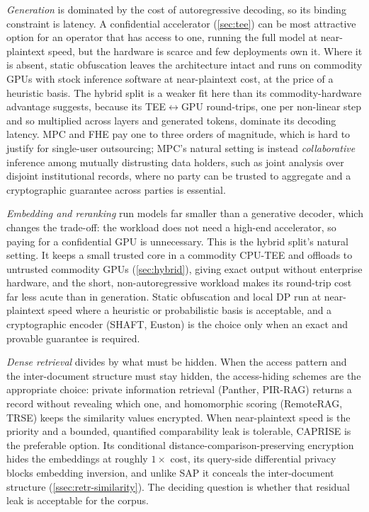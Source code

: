 \emph{Generation} is dominated by the cost of autoregressive decoding, so its binding
constraint is latency. A confidential accelerator (\cref{sec:tee}) can be most attractive option for
an operator that has access to one, running the full model at near-plaintext speed, but the hardware is
scarce and few deployments own it. Where it is absent, static obfuscation leaves the
architecture intact and runs on commodity GPUs with stock inference software at near-plaintext
cost, at the price of a heuristic basis. The hybrid
split is a weaker fit here than its commodity-hardware advantage suggests, because its
TEE$\leftrightarrow$GPU round-trips, one per non-linear step and so multiplied across layers and
generated tokens, dominate its decoding latency.
MPC and FHE pay one to three orders of magnitude, which is hard to justify for single-user
outsourcing; MPC's natural setting is instead \emph{collaborative} inference among mutually
distrusting data holders, such as joint analysis over disjoint institutional records, where no
party can be trusted to aggregate and a cryptographic guarantee across parties is essential.

\emph{Embedding and reranking} run models far smaller than a generative decoder, which changes the
trade-off: the workload does not need a high-end accelerator, so paying for a confidential GPU
is unnecessary. This is the hybrid split's natural setting. It keeps a small trusted core in a
commodity CPU-TEE and offloads to untrusted commodity GPUs (\cref{sec:hybrid}), giving exact
output without enterprise hardware, and the short, non-autoregressive workload makes its
round-trip cost far less acute than in generation. Static obfuscation and local DP run at
near-plaintext speed where a heuristic or probabilistic basis is acceptable, and a
cryptographic encoder (SHAFT, Euston) is the choice only when an exact and provable guarantee
is required.

\emph{Dense retrieval} divides by what must be hidden. When the access pattern and the
inter-document structure must stay hidden, the access-hiding schemes are the appropriate choice: private
information retrieval (Panther, PIR-RAG) returns a record without revealing which one, and
homomorphic scoring (RemoteRAG, TRSE) keeps the similarity values encrypted. When near-plaintext
speed is the priority and a bounded, quantified comparability leak is tolerable, CAPRISE is the
preferable option. Its conditional distance-comparison-preserving encryption hides the embeddings at
roughly $1\times$ cost, its query-side differential privacy blocks embedding inversion, and
unlike SAP it conceals the inter-document structure (\cref{ssec:retr-similarity}). The deciding
question is whether that residual leak is acceptable for the corpus.

